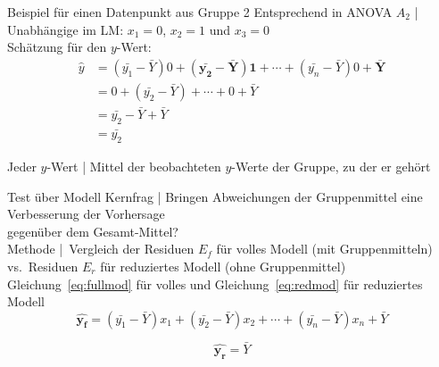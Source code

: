 \begin{frame}
  {Beispiel für einen Datenpunkt aus Gruppe 2}
  Entsprechend in ANOVA $A_2$ | Unabhängige im LM: $x_1=0$, $x_2=1$ und $x_3=0$\\
  Schätzung für den $y$-Wert:\\
  \Halbzeile  
  \begin{equation}
    \begin{split}
      \hat{y} & = (\bar{y_1}-\bar{Y})0 + \mathbf{(\bar{y_2}-\bar{Y})1} + \cdots + (\bar{y_n}-\bar{Y})0 + \mathbf{\bar{Y}}\\
       &= 0 + (\bar{y_2}-\bar{Y}) + \cdots + 0 + \bar{Y} \\
       &= \bar{y_2} - \bar{Y} + \bar{Y} \\
       &= \bar{y_2}
    \end{split}
  \end{equation}
  
  \Zeile
  Jeder $\hat{y}$-Wert | Mittel der beobachteten $y$-Werte der Gruppe, zu der er gehört\\
\end{frame}

\begin{frame}
  {Test über Modell}
  Kernfrag | \alert{Bringen Abweichungen der Gruppenmittel eine Verbesserung der Vorhersage\\
  gegenüber dem Gesamt-Mittel?}\\
  \Halbzeile
  Methode | Vergleich der \alert{Residuen $E_f$ für volles Modell} (mit Gruppenmitteln)\\
  vs.\ \alert{Residuen $E_r$ für reduziertes Modell} (ohne Gruppenmittel)\\

  \Zeile
  Gleichung~\ref{eq:fullmod} für volles und Gleichung~\ref{eq:redmod} für reduziertes Modell\\
  
  \begin{equation}
      \mathbf{\hat{y_f}}=(\bar{y_1}-\bar{Y})x_1 + (\bar{y_2}-\bar{Y})x_2 + \cdots + (\bar{y_n}-\bar{Y})x_n + \bar{Y}
      \label{eq:fullmod}
  \end{equation}
  
  \begin{equation}
    \mathbf{\hat{y_r}}=\bar{Y}
      \label{eq:redmod}
  \end{equation}
  
\end{frame}

